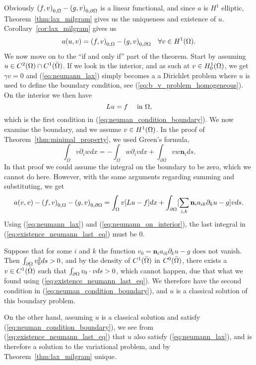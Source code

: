 \begin{bev}
   Obviously $ {(f,v)}_{0,\Omega} - {(g,v)}_{0,\partial\Omega}$ is a linear functional, 
   and since $a$ is $H^1$ elliptic, Theorem~\ref{thm:lax_milgram} gives us the 
   uniqueness and existence of $u$.
   Corollary~\ref{cor:lax_milgram} gives us
   \begin{equation}
      a(u,v) = {(f,v)}_{0,\Omega} - {(g,v)}_{0,\partial\Omega} \quad \forall v \in H^1(\Omega). \label{eq:neumann_lax}
   \end{equation}
   We now move on to the ``if and only if'' part of the theorem. Start by 
   assuming $u \in C^2(\Omega)\cap C^1(\bar{\Omega})$.
   If we look in the interior, and as such at $v \in H^1_0(\Omega)$, we get $\gamma v=0$ 
   and (\ref{eq:neumann_lax}) simply becomes a a Dirichlet problem where 
   $u$ is used to define the boundary condition, see (\ref{eq:b_v_problem_homogeneous}).
   On the interior we then have 
   \begin{equation}
    Lu = f \quad \text{ in }\Omega, \label{eq:neumann_on_interior}
   \end{equation} 
   which is the first condition in (\ref{eq:neuman_condition_boundary}).
   We now examine the boundary, and we assume $v\in H^1(\Omega)$.
   In the proof of Theorem~\ref{thm:minimal_property}, we used Green's formula,
    \begin{equation} %
        \int_\Omega v\partial_i w dx = -\int_\Omega w \partial_i v dx + \int_{\partial \Omega} v w \mathbf{n}_i ds.
    \end{equation}
   In that proof we could assume the integral on the boundary to be zero, which 
   we cannot do here. However, with the same arguments regarding summing and substituting, 
   we get
   \begin{equation}
      a(v,v) - {(f,v)}_{0,\Omega} - {(g,v)}_{0,\partial\Omega} = 
      \int_\Omega v[Lu - f] dx + \int_{\partial \Omega}
     [ \sum_{i,k}  \mathbf{n}_i a_{ik} \partial_k u-g]v ds.
     \label{eq:existence_neumann_last_eq}
   \end{equation}
   Using (\ref{eq:neumann_lax}) and (\ref{eq:neumann_on_interior}),
   the last integral in (\ref{eq:existence_neumann_last_eq}) must be $0$.

   Suppose that for some $i$ and $k$ the function $v_0 = \mathbf{n}_i a_{ik} \partial_k u -g$ does 
   not vanish. Then $\int_{\partial\Omega}v_0^2ds>0$, and by the density of 
   $C^1(\bar{\Omega})$ in $C^0(\bar{\Omega})$, there exists a $v\in C^1(\bar{\Omega})$
   such that  $\int_{\partial\Omega}v_0\cdot vds>0$, which cannot happen, due that 
   what we found using (\ref{eq:existence_neumann_last_eq}). 
   We therefore have the second condition in (\ref{eq:neuman_condition_boundary}),
   and $u$ is a classical solution of this boundary problem.

   On the other hand, assuming $u$ is a classical solution and satisfy (\ref{eq:neuman_condition_boundary}),
   we see from (\ref{eq:existence_neumann_last_eq}) that $u$ also satisfy 
   (\ref{eq:neumann_lax}), and is therefore a solution to the variational 
   problem, and by Theorem~\ref{thm:lax_milgram} unique.
\end{bev}